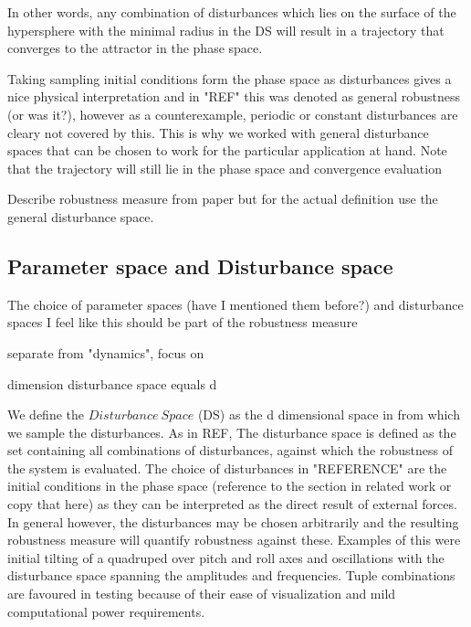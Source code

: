
    In other words, any combination of disturbances which lies on the surface of the hypersphere with the minimal radius in the DS will result in a trajectory that converges to the attractor in the phase space. 

    Taking sampling initial conditions form the phase space as disturbances gives a nice physical interpretation and in "REF" this was denoted as general robustness (or was it?), however as a counterexample, periodic or constant disturbances are cleary not covered by this. 
    This is why we worked with general disturbance spaces that can be chosen to work for the particular application at hand. 
    Note that the trajectory will still lie in the phase space and convergence evaluation 


    Describe robustness measure from paper but for the actual definition use the general disturbance space. 


\subsection{ Parameter space and Disturbance space}
    
    The choice of parameter spaces (have I mentioned them before?) and disturbance spaces
    I feel like this should be part of the robustness measure

    separate from "dynamics", focus on 

    dimension disturbance space equals d

    We define the $Disturbance\ Space$ (DS) as the d dimensional space in from which we sample the disturbances. As in REF, 
    The disturbance space is defined as the set containing all combinations of disturbances, against which the robustness of the system is evaluated. The choice of disturbances in "REFERENCE" are the initial conditions in the phase space (reference to the section in related work or copy that here) as they can be interpreted as the direct result of external forces. In general however, the disturbances may be chosen arbitrarily and the resulting robustness measure will quantify robustness against these. Examples of this were initial tilting of a quadruped over pitch and roll axes and oscillations with the disturbance space spanning the amplitudes and frequencies. Tuple combinations are favoured in testing because of their ease of visualization and mild computational power requirements.  

